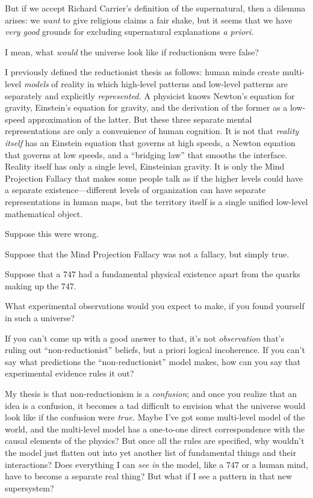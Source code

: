 {
 But if we accept Richard Carrier's definition of
the supernatural, then a dilemma arises: we \textit{want} to give
religious claims a fair shake, but it seems that we have \textit{very
good} grounds for excluding supernatural explanations \textit{a
priori.}}

{
 I mean, what \textit{would} the universe look like if reductionism
were false?}

{
 I previously defined the reductionist thesis as follows: human
minds create multi-level \textit{models} of reality in which high-level
patterns and low-level patterns are separately and explicitly
\textit{represented.} A physicist knows Newton's
equation for gravity, Einstein's equation for gravity,
and the derivation of the former as a low-speed approximation of the
latter. But these three separate mental representations are only a
convenience of human cognition. It is not that \textit{reality itself}
has an Einstein equation that governs at high speeds, a Newton equation
that governs at low speeds, and a ``bridging
law'' that smooths the interface. Reality itself has
only a single level, Einsteinian gravity. It is only the Mind
Projection Fallacy that makes some people talk as if the higher levels
could have a separate existence---different levels of organization can
have separate representations in human maps, but the territory itself
is a single unified low-level mathematical object.}

{
 Suppose this were wrong.}

{
 Suppose that the Mind Projection Fallacy was not a fallacy, but
simply true.}

{
 Suppose that a 747 had a fundamental physical existence apart from
the quarks making up the 747.}

{
 What experimental observations would you expect to make, if you
found yourself in such a universe?}

{
 If you can't come up with a good answer to that,
it's not \textit{observation} that's
ruling out ``non-reductionist''
beliefs, but a priori logical incoherence. If you can't
say what predictions the
``non-reductionist'' model makes,
how can you say that experimental evidence rules it out?}

{
 My thesis is that non-reductionism is a \textit{confusion}; and
once you realize that an idea is a confusion, it becomes a tad
difficult to envision what the universe would look like if the
confusion were \textit{true.} Maybe I've got some
multi-level model of the world, and the multi-level model has a
one-to-one direct correspondence with the causal elements of the
physics? But once all the rules are specified, why
wouldn't the model just flatten out into yet another
list of fundamental things and their interactions? Does everything I
can \textit{see in} the model, like a 747 or a human mind, have to
become a separate real thing? But what if I see a pattern in that new
supersystem?}

